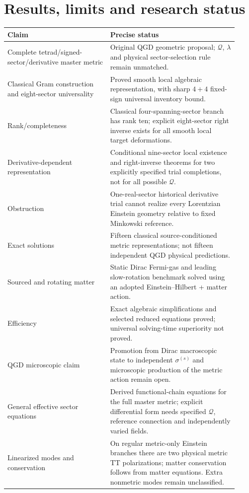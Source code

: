\documentclass[11pt,a4paper]{article}
\begin{document}
\section{Results, limits and research status}\label{sec:status}
\renewcommand{\arraystretch}{1.16}
\begin{longtable}{@{}p{0.41\linewidth}p{0.51\linewidth}@{}}\toprule
Claim & Precise status\\\midrule\endhead
Complete tetrad/signed-sector/derivative master metric & Original QGD geometric proposal; \(\mathcal Q\), \(\lambda\) and physical sector-selection rule remain unmatched.\\
Classical Gram construction and eight-sector universality & Proved smooth local algebraic representation, with sharp \(4+4\) fixed-sign universal inventory bound.\\
Rank/completeness & Classical four-spanning-sector branch has rank ten; explicit eight-sector right inverse exists for all smooth local target deformations.\\
Derivative-dependent representation & Conditional nine-sector local existence and right-inverse theorems for two explicitly specified trial completions, not for all possible \(\mathcal Q\).\\
Obstruction & One-real-sector historical derivative trial cannot realize every Lorentzian Einstein geometry relative to fixed Minkowski reference.\\
Exact solutions & Fifteen classical source-conditioned metric representations; not fifteen independent QGD physical predictions.\\
Sourced and rotating matter & Static Dirac Fermi-gas and leading slow-rotation benchmark solved using an adopted Einstein--Hilbert + matter action.\\
Efficiency & Exact algebraic simplifications and selected reduced equations proved; universal solving-time superiority not proved.\\
QGD microscopic claim & Promotion from Dirac macroscopic state to independent \(\sigma^{(s)}\) and microscopic production of the metric action remain open.\\
General effective sector equations & Derived functional-chain equations for the full master metric; explicit differential form needs specified $\mathcal Q$, reference connection and independently varied fields.\\
Linearized modes and conservation & On regular metric-only Einstein branches there are two physical metric TT polarizations; matter conservation follows from matter equations. Extra nonmetric modes remain unclassified.\\

\end{longtable}
\end{document}
